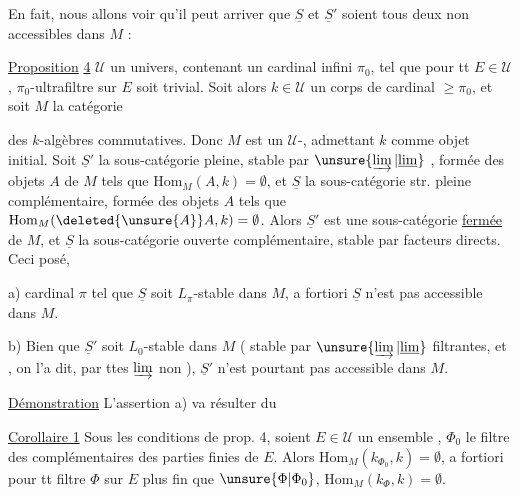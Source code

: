En fait, nous allons voir qu'il peut arriver que $\underline S$ et
$\underline S'$ soient tous deux non accessibles dans $M$ :

\uline{Proposition} \uline{4}  $\mathcal U$ un univers, contenant
un cardinal infini $\pi_0$, tel que pour tt $E\in\mathcal U$,
  $\pi_0$-ultrafiltre sur
$E$ soit trivial. Soit alors $k\in\mathcal U$ un corps de cardinal
$\geq\pi_0$, et soit $M$ la catégorie

des $k$-algèbres commutatives. Donc $M$ est un
$\mathcal U$-, admettant $k$ comme objet initial.
Soit $\underline S'$ la sous-catégorie  pleine,
stable par  $\unsure{\varinjlim|\underline{\lim}}$
, formée des objets $A$ de
$M$ tels que $\mathrm{Hom}_M(A,k)=\emptyset$, et $\underline S$ la
sous-catégorie str. pleine complémentaire, formée des objets $A$ tels
que $\mathrm{Hom}_M(\deleted{\unsure{A}}A,k)=\emptyset$. Alors $\underline S'$ est une
sous-catégorie \uline{fermée} de $M$, et
$\underline S$ la sous-catégorie ouverte complémentaire,
stable par facteurs directs. Ceci posé,

a)  
cardinal $\pi$ tel que $\underline S$ soit $L_{\pi}$-stable dans
$M$, a fortiori $\underline S$ n'est pas accessible dans $M$.

b) Bien que $\underline S'$ soit $L_0$-stable dans $M$
( stable par $\unsure{\varinjlim|\underline{\lim}}$
filtrantes, et \unsure{$=$}, on l'a dit, par ttes $\varinjlim$ non
), $\underline S'$ n'est pourtant pas accessible dans $M$.

\uline{Démonstration}  L'assertion a) va résulter du

\uline{Corollaire 1} Sous les conditions de prop. 4, soient
$E\in\mathcal U$ un ensemble , $\Phi_0$ le filtre des
complémentaires des parties finies de $E$. Alors
 $\mathrm{Hom}_M(k_{\Phi_0},k)=\emptyset$,
a fortiori pour tt filtre $\Phi$ sur $E$ plus fin que
$\unsure{\Phi|\Phi_0}$,  $\mathrm{Hom}_M(k_{\Phi},k)=\emptyset$.

